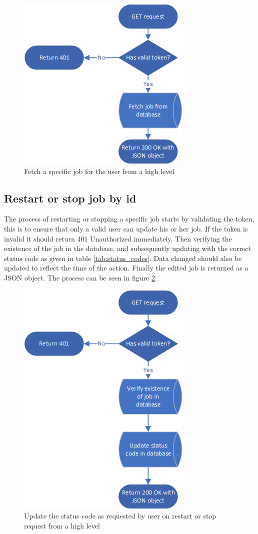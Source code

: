 \documentclass[../main.tex]{subfiles}
\begin{document}
\begin{figure}[H]
    \centering
    \includegraphics{img/middleware_get_single_job.png}
    \caption{Fetch a specific job for the user from a high level}
    \label{fig:middleware_get_single_job}
\end{figure}

\subsection*{Restart or stop job by id}
The process of restarting or stopping a specific job starts by validating the token, this is to ensure that only a valid user can update his or her job. If the token is invalid it should return 401 Unauthorized immediately. Then verifying the existence of the job in the database, and subsequently updating with the correct status code as given in table \ref{tab:status_codes}. Data changed should also be updated to reflect the time of the action. Finally the edited job is returned as a JSON object. The process can be seen in figure \ref{fig:middleware_change_status}.
\begin{figure}[H]
    \centering
    \includegraphics{img/middleware_change_status.png}
    \caption{Update the status code as requested by user on restart or stop request from a high level}
    \label{fig:middleware_change_status}
\end{figure}
\end{document}
